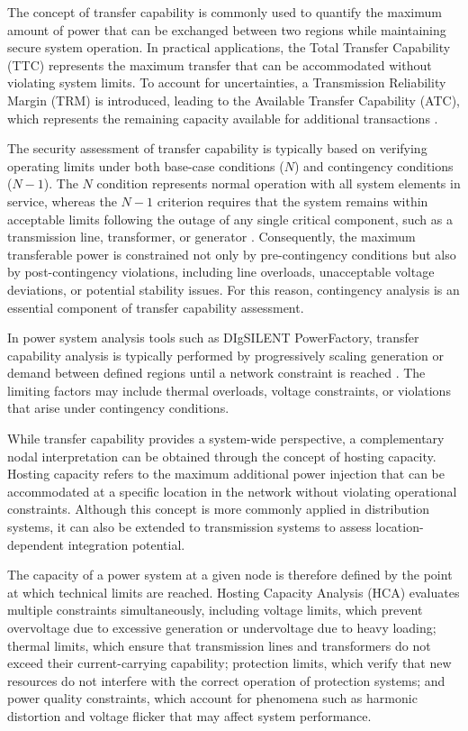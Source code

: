 The concept of transfer capability is commonly used to quantify the maximum amount of power that can be exchanged between two regions while maintaining secure system operation. In practical applications, the Total Transfer Capability (TTC) represents the maximum transfer that can be accommodated without violating system limits. To account for uncertainties, a Transmission Reliability Margin (TRM) is introduced, leading to the Available Transfer Capability (ATC), which represents the remaining capacity available for additional transactions \cite{taylor1994power,nerc1996atc}.

The security assessment of transfer capability is typically based on verifying operating limits under both base-case conditions (\(N\)) and contingency conditions (\(N-1\)). The \(N\) condition represents normal operation with all system elements in service, whereas the \(N-1\) criterion requires that the system remains within acceptable limits following the outage of any single critical component, such as a transmission line, transformer, or generator \cite{kundur1994,wood2013power}. Consequently, the maximum transferable power is constrained not only by pre-contingency conditions but also by post-contingency violations, including line overloads, unacceptable voltage deviations, or potential stability issues. For this reason, contingency analysis is an essential component of transfer capability assessment.

In power system analysis tools such as DIgSILENT PowerFactory, transfer capability analysis is typically performed by progressively scaling generation or demand between defined regions until a network constraint is reached \cite{digsilent2024pfmanual}. The limiting factors may include thermal overloads, voltage constraints, or violations that arise under contingency conditions.

While transfer capability provides a system-wide perspective, a complementary nodal interpretation can be obtained through the concept of hosting capacity. Hosting capacity refers to the maximum additional power injection that can be accommodated at a specific location in the network without violating operational constraints. Although this concept is more commonly applied in distribution systems, it can also be extended to transmission systems to assess location-dependent integration potential.

The capacity of a power system at a given node is therefore defined by the point at which technical limits are reached. Hosting Capacity Analysis (HCA) evaluates multiple constraints simultaneously, including voltage limits, which prevent overvoltage due to excessive generation or undervoltage due to heavy loading; thermal limits, which ensure that transmission lines and transformers do not exceed their current-carrying capability; protection limits, which verify that new resources do not interfere with the correct operation of protection systems; and power quality constraints, which account for phenomena such as harmonic distortion and voltage flicker that may affect system performance.

